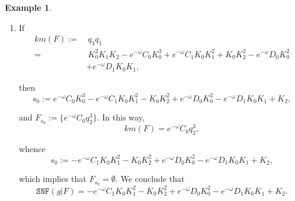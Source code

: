 \documentclass{amsart}
\theoremstyle{definition}
\newtheorem{example}[theorem]{Example}
\theoremstyle{remark}
\numberwithin{equation}{section}
\begin{document}
\begin{example}
\begin{enumerate}
then 
\[
s_0:=\left(e^{-\omega}-e^{-4 \omega}\right) K_0 K_2^2-e^{-3 \omega} B K_0 K_2-e^{-3 \omega} C_1 K_1 K_2+\left(1-e^{-3 w} D_1\right) K_2, 
\]

and $F_{s_0}=\emptyset$. Thus, 
\[
\texttt{SNF}(g | F)=\left(e^{-\omega}-e^{-4 \omega}\right) K_0 K_2^2-e^{-3 \omega} B K_0 K_2-e^{-3 \omega} C_1 K_1 K_2+\left(1-e^{-3 w} D_1\right) K_2.
\]

\item [\rm (ii)] If
\begin{align*}
km(F):= &\ q_3q_1 \\
= &\ K_0^2 K_1 K_2-e^{-\omega} C_0 K_0^3+e^{-\omega} C_1 K_0 K_1^2+K_0 K_2^2-e^{-\omega} D_0 K_0^2\\
 &+e^{-\omega} D_1 K_0 K_1,
\end{align*}

then
\[
s_0:=e^{-\omega} C_0 K_0^3-e^{-\omega} C_1 K_0 K_1^2-K_0 K_2^2+e^{-\omega} D_0 K_0^2-e^{-\omega} D_1 K_0 K_1+K_2,
\]

and $F_{s_0}:=\{e^{-\omega}C_0q_2^3\}$. In this way, 
$$
km(F)=e^{-\omega}C_0q_2^3, 
$$ 

whence
\[
s_0:=-e^{-\omega} C_1 K_0 K_1^2-K_0 K_2^2+e^{-\omega} D_0 K_0^2-e^{-\omega} D_1 K_0 K_1+K_2,
\]

which implies that $F_{s_0} = \emptyset$. We conclude that
\[
\texttt{SNF}(g | F)=-e^{-\omega} C_1 K_0 K_1^2-K_0 K_2^2+e^{-\omega} D_0 K_0^2-e^{-\omega} D_1 K_0 K_1+K_2.
\] 
\end{enumerate}
\end{example}
\end{document}

